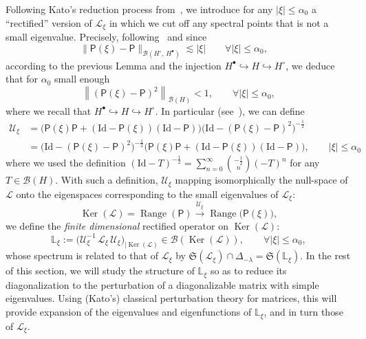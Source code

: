 \documentclass[10pt]{amsart}
\theoremstyle{definition}\newtheorem{defi}[theo]{Definition}\newtheorem{rema}[theo]{Remark}\newtheorem{exam}[theo]{Example}\newtheorem{exem}[theo]{Example}\newtheorem{nota}[theo]{Notation}
\DeclareMathOperator{\range}{Range}
\DeclareMathOperator{\nul}{Ker}
\newcommand{\Id}{\mathrm{Id}}
\newcommand{\rectL}{\mathbb{L}}
\newcommand{\fkS}{\mathfrak{S}}
\newcommand{\LL}{\mathcal{L}}
\newcommand{\PP}{\mathsf{P}}
\newcommand{\UU}{\mathcal{U}}
\newcommand{\BBB}{\mathscr{B}}
\newcommand{\Ss}{H}
\newcommand{\Ssp}{H^{\bullet}}
\newcommand{\Ssm}{H^{\circ}}
\renewcommand*\le{\leqslant}
\let\oldforall\forall
\renewcommand*{\forall}{\mathrel{\oldforall}}
\begin{document}
Following Kato's reduction process from~\cite[Section~I-4.6, pp.~32--34]{K1995}, we introduce for any $| \xi | \le \alpha_0$ a ``rectified'' version of $\LL_\xi$ in which we cut off any spectral points that is not a small eigenvalue. Precisely, following~\cite[Section~I-4.6]{K1995} and since
\[
\|\PP(\xi)-\PP\|_{\BBB(\Ssm,\,\Ssp)} \lesssim |\xi| \qquad \forall | \xi | \le \alpha_0, \quad
\]
according to the previous Lemma and the injection $\Ssp \hookrightarrow \Ss \hookrightarrow \Ssm$, we deduce that for $\alpha_0$ small enough
\[
\left\|\left(\PP(\xi)-\PP\right)^{2}\right\|_{\BBB(\Ss)} < 1, \qquad \forall | \xi | \le \alpha_0,
\]
where we recall that $\Ssp \hookrightarrow \Ss\hookrightarrow \Ssm.$ In particular (see~\cite[Eqs.~(4.36)--(4.39), p.~33]{K1995}), we can define
\begin{align*}
\UU_\xi &= \Big(\PP(\xi) \PP + (\Id - \PP(\xi))(\Id - \PP) \Big) \Big(\Id -(\PP(\xi) - \PP)^2 \Big)^{-\frac{1}{2}} \\
&= \Big(\Id -(\PP(\xi) - \PP)^2 \Big)^{-\frac{1}{2}} \Big(\PP(\xi) \PP + (\Id - \PP(\xi))(\Id - \PP) \Big), \qquad |\xi| \le \alpha_0
\end{align*}
where we used the definition $(\Id - T)^{-\frac{1}{2}} = \sum_{n= 0}^\infty \binom{-\frac{1}{2}}{n} (-T)^n$ for any $T \in \BBB(\Ss)$. With such a definition, $\UU_{\xi}$ mapping isomorphically the null-space of $\LL$ onto the eigenspaces corresponding to the small eigenvalues of $\LL_\xi$:
\begin{equation*}
\nul(\LL) = \range(\PP) \xrightarrow{\UU_{\xi}} \range\big(\PP(\xi) \big),
\end{equation*}
we define the \emph{finite dimensional} rectified operator on $\nul(\LL)$:
\begin{equation*}
\quad \rectL_{\xi} := \Big(\UU_{\xi}^{-1} \, \LL_{\xi} \, \UU_{\xi} \Big)_{| \nul(\LL) } \in \BBB\left(\nul(\LL) \right), \qquad \forall | \xi | \le \alpha_0, \quad
\end{equation*}
whose spectrum is related to that of $\LL_{\xi}$ by $\fkS(\LL_{\xi}) \cap \Delta_{-\lambda} = \fkS(\rectL_{\xi}).$ In the rest of this section, we will study the structure of $\rectL_{ \xi}$ so as to reduce its diagonalization to the perturbation of a diagonalizable matrix with simple eigenvalues. Using (Kato's) classical perturbation theory for matrices, this will provide expansion of the eigenvalues and eigenfunctions of $\rectL_\xi$, and in turn those of $\LL_{\xi}$.
\end{document}
